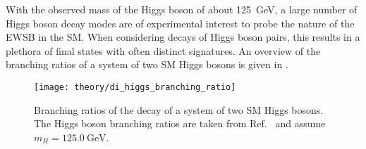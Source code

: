 With the observed mass of the Higgs boson of about \SI{125}{\GeV}, a large
number of Higgs boson decay modes are of experimental interest to probe the
nature of the EWSB in the SM. When considering decays of Higgs boson pairs, this
results in a plethora of final states with often distinct signatures. An
overview of the branching ratios of a system of two SM Higgs bosons is given in
.

\begin{figure}[htbp]
  \centering

  \texttt{[image: theory/di\_higgs\_branching\_ratio]}

  \caption{Branching ratios of the decay of a system of two SM Higgs bosons. The
    Higgs boson branching ratios are taken from Ref.~\cite{deFlorian:2016spz}
    and assume~$m_{H} = \SI{125.0}{\GeV}$.}%
  \label{fig:hh_branching_ratios}
\end{figure}

